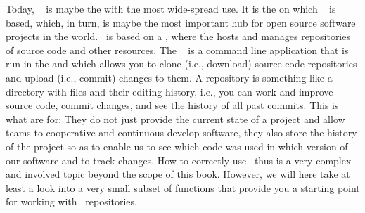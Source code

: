 %
%
Today, \git~\cite{S2023LG,T2024BGAGVCPMATFTND} is maybe the  with the most wide-spread use.
It is the  on which \github~\cite{PRGWSUdVLFTEKPKFBV2016TSRFTAOGAG} is based, which, in turn, is maybe the most important hub for open source software projects in the world.
\git\ is based on a , where the  hosts and manages repositories of source code and other resources.
The \git\  is a command line application that is run in the  and which allows you to clone (i.e., download) source code repositories and upload (i.e., commit) changes to them.
A repository is something like a directory with files and their editing history, i.e., you can work and improve source code, commit changes, and see the history of all past commits.
This is what  are for:
They do not just provide the current state of a project and allow teams to cooperative and continuous develop software, they also store the history of the project so as to enable us to see which code was used in which version of our software and to track changes.
How to correctly use \git\ thus is a very complex and involved topic beyond the scope of this book.
However, we will here take at least a look into a very small subset of functions that provide you a starting point for working with \git\ repositories.%
%
%
%
\endhsection%
